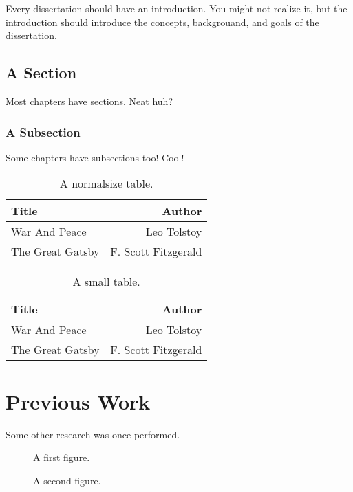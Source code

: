 \documentclass{uicthesi}
\begin{document}
Every dissertation should have an introduction.  You might not realize
it, but the introduction should introduce the concepts, backgrouand,
and goals of the dissertation.

\section{A Section}

Most chapters have sections. Neat huh?

\subsection{A Subsection}

Some chapters have subsections too! Cool!

\begin{table}
\begin{center}
\begin{tabular}{|l|r|}
  \hline 
Title & Author \\
\hline
War And Peace & Leo Tolstoy \\
The Great Gatsby & F. Scott Fitzgerald \\ \hline
\end{tabular}
\caption{A normalsize table.}
\end{center}
\end{table}

\begin{table}
\begin{center}
\caption{A small table.}
\begin{tabular}{|l|r|}
  \hline 
Title & Author \\
\hline
War And Peace & Leo Tolstoy \\
The Great Gatsby & F. Scott Fitzgerald \\ \hline
\end{tabular}
\end{center}
\end{table}

\chapter{Previous Work}

Some other research was once performed.

\begin{figure}
\caption{A first figure.}
\end{figure}

\begin{figure}
\caption{A second figure.}
\end{figure}
\end{document}
